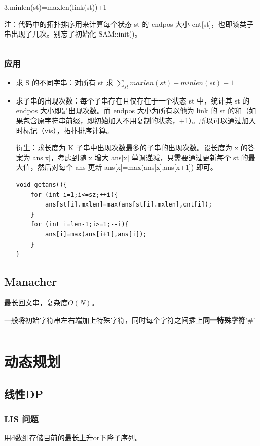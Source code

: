 \documentclass[a4paper,11pt]{article}
\begin{document}
3.minlen(st)=maxlen(link(st))+1

注：代码中的拓扑排序用来计算每个状态 st 的 endpos 大小 cnt[st]，也即该类子串出现了几次。别忘了初始化 SAM::init()。

\inputminted[linenos]{c++}{string/sam.cpp}

\subsubsection{应用}
\begin{itemize}
\item
  求 S 的不同字串：对所有 st 求 \(\sum_{st}maxlen(st)-minlen(st)+1\)
\item
  求子串的出现次数：每个子串存在且仅存在于一个状态 st 中，统计其 st 的 endpos 大小即是出现次数。而 endpos 大小为所有以他为 link 的 st 的和（如果包含原字符串前缀，即初始加入不用复制的状态，+1）。所以可以通过加入时标记（vis），拓扑排序计算。

衍生：求长度为 K 子串中出现次数最多的子串的出现次数。设长度为 x 的答案为 ans[x]，考虑到随 x 增大 ans[x] 单调递减，只需要通过更新每个 st 的最大值，然后对每个 ans 更新 ans[x]=max(ans[x],ans[x+1]) 即可。

\begin{verbatim}
void getans(){
    for (int i=1;i<=sz;++i){
        ans[st[i].mxlen]=max(ans[st[i].mxlen],cnt[i]);
    }
    for (int i=len-1;i>=1;--i){
        ans[i]=max(ans[i+1],ans[i]);
    }
}
\end{verbatim}

\end{itemize}

\subsection{Manacher}
最长回文串，复杂度\(O(N)\)。

一般将初始字符串左右端加上特殊字符，同时每个字符之间插上\textbf{同一特殊字符}'\#'
\inputminted[linenos]{c++}{string/manacher.cpp}


\newpage
\section{动态规划}
\subsection{线性DP}
\subsubsection{LIS 问题}
用d数组存储目前的最长上升or下降子序列。
\inputminted[linenos]{c++}{dp/lis.cpp}
\end{document}
